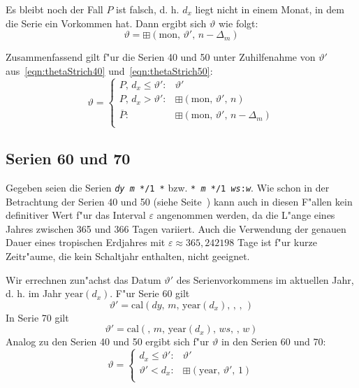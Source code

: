 \documentclass[a4paper]{article}
\newcommand*{\monf}{\mathrm{mon}}
\newcommand*{\yearf}{\mathrm{year}}
\newcommand*{\calf}{\mathrm{cal}}
\newcommand*{\addff}{\boxplus}
\numberwithin{equation}{section}
\begin{document}
Es bleibt noch der Fall $P$ ist falsch, d. h. $d_x$ liegt nicht in einem Monat,
in dem die Serie ein Vorkommen hat.
Dann ergibt sich $\vartheta$ wie folgt:
\begin{equation}\vartheta = \addff(\monf,\,\vartheta',\,n-\Delta_m)\end{equation}

\noindent Zusammenfassend gilt f"ur die Serien 40 und 50 unter Zuhilfenahme
von $\vartheta'$ aus~\eqref{eqn:thetaStrich40} und~\eqref{eqn:thetaStrich50}:
\begin{equation}
  \vartheta = \left\{\begin{array}{ll}
      P,\,d_x \le \vartheta' : & \vartheta' \\
      P,\,d_x > \vartheta' : & \addff(\monf,\,\vartheta',\,n) \\
      \overline{P} : & \addff(\monf,\,\vartheta',\,n-\Delta_m) \\
    \end{array}\right.
\end{equation}


%
%
\subsection{Serien 60 und 70}
Gegeben seien die Serien \texttt{\textit{dy} \textit{m} */1 *} bzw.
\texttt{* \textit{m} */1 \textit{ws}:\textit{w}}. Wie schon in der Betrachtung
der Serien 40 und 50 (siehe Seite~\pageref{ssec:approx40_50}) kann auch in
diesen F"allen kein definitiver Wert f"ur das Interval $\varepsilon$ angenommen
werden, da die L"ange eines Jahres zwischen 365 und 366 Tagen variiert. Auch die
Verwendung der genauen Dauer eines tropischen Erdjahres mit
$\varepsilon \approx 365,242198$ Tage ist f"ur kurze Zeitr"aume, die kein
Schaltjahr enthalten, nicht geeignet.

Wir errechnen zun"achst das Datum $\vartheta'$ des Serienvorkommens im aktuellen
Jahr, d. h. im Jahr $\yearf(d_x)$. F"ur Serie 60 gilt
\begin{equation}\vartheta' = \calf(dy,\,m,\,\yearf(d_x),\,,\,,\,)\end{equation}
In Serie 70 gilt
\begin{equation}\vartheta' = \calf(,\,m,\,\yearf(d_x),\,ws,\,,\,w)\end{equation}
Analog zu den Serien 40 und 50 ergibt sich f"ur $\vartheta$ in den Serien 60
und 70:
\begin{equation}
  \vartheta = \left\{\begin{array}{ll}
    d_x \le \vartheta' : & \vartheta' \\
    \vartheta' < d_x : & \addff(\yearf,\,\vartheta',\,1) \\
    \end{array}\right.
\end{equation}
\end{document}
